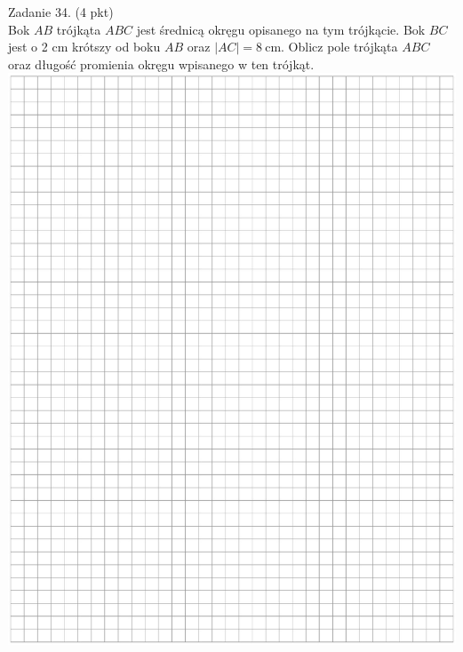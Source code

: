 \documentclass[10pt]{article}
\begin{document}
Zadanie 34. (4 pkt)\\
Bok \(A B\) trójkąta \(A B C\) jest średnicą okręgu opisanego na tym trójkącie. Bok \(B C\) jest o 2 cm krótszy od boku \(A B\) oraz \(|A C|=8 \mathrm{~cm}\). Oblicz pole trójkąta \(A B C\) oraz długość promienia okręgu wpisanego w ten trójkąt.\\
\includegraphics[max width=\textwidth, center]{2024_11_21_a68a2ba4fc31c5fb438eg-13}
\end{document}
